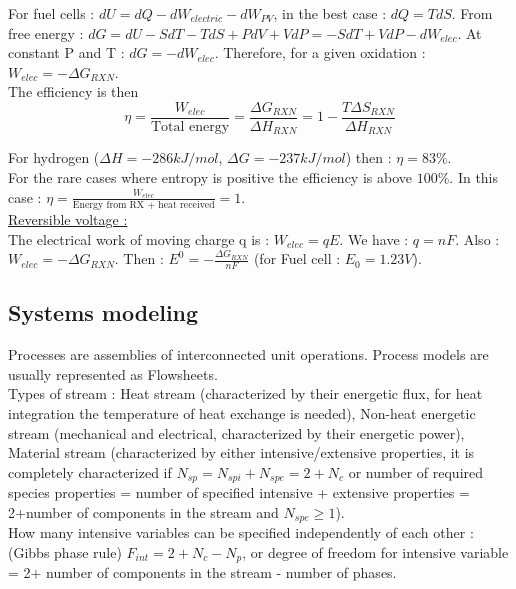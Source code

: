 \documentclass[../main.tex]{subfiles}
\begin{document}
For fuel cells : $dU = dQ - dW_{electric} - dW_{PV}$, in the best case : $dQ  =TdS$. From free energy : $dG = dU-SdT-TdS+PdV+VdP = -SdT + VdP -dW_{elec}$. At constant P and T : $dG = -dW_{elec}$. Therefore, for a given oxidation : $W_{elec} = -\Delta G_{RXN}$.\\
The efficiency is then \begin{equation}
    \eta = \frac{W_{elec}}{\text{Total energy}} = \frac{\Delta G_{RXN}}{\Delta H_{RXN}} = 1-\frac{T\Delta S_{RXN}}{\Delta H_{RXN}}
\end{equation}

For hydrogen ($\Delta H = -286kJ/mol$, $\Delta G = -237 kJ/mol$) then : $\eta = 83\%$.\\

For the rare cases where entropy is positive the efficiency is above $100\%$. In this case : $\eta = \frac{W_{elec}}{\text{Energy from RX + heat received}} = 1$. \\

\quad \underline{Reversible voltage :}\\
The electrical work of moving charge q is : $W_{elec} = qE$. We have : $q=nF$. Also : $W_{elec} = -\Delta G_{RXN}$. Then : $E^0 = -\frac{\Delta G_{RXN}}{nF}$ (for Fuel cell : $E_0 = 1.23V$).\\

\subsection{Systems modeling}
Processes are assemblies of interconnected unit operations. Process models are usually represented as Flowsheets. \\
Types of stream : Heat stream (characterized by their energetic flux, for heat integration the temperature of heat exchange is needed), Non-heat energetic stream (mechanical and electrical, characterized by their energetic power), Material stream (characterized by either intensive/extensive properties, it is completely characterized if $N_{sp} = N_{spi} + N_{spe} = 2+N_c$ or number of required species properties = number of specified intensive + extensive properties = 2+number of components in the stream and $N_{spe} \geq 1$).\\
How many intensive variables can be specified independently of each other : (Gibbs phase rule) $F_{int} = 2+N_c-N_p$, or degree of freedom for intensive variable = 2+ number of components in the stream - number of phases.\\
\end{document}
